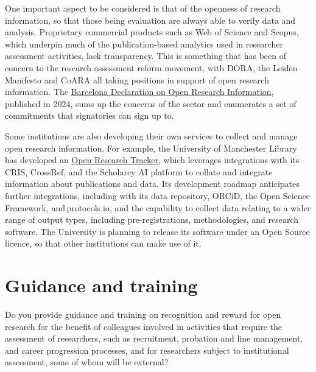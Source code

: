 \documentclass[
  letterpaper,
  DIV=11,
  numbers=noendperiod,
  oneside]{scrreprt}
\begin{document}
One important aspect to be considered is that of the openness of
research information, so that those being evaluation are always able to
verify data and analysis. Proprietary commercial products such as Web of
Science and Scopus, which underpin much of the publication-based
analytics used in researcher assessment activities, lack transparency.
This is something that has been of concern to the research assessment
reform movement, with DORA, the Leiden Manifesto and CoARA all taking
positions in support of open research information. The
\href{https://barcelona-declaration.org/}{Barcelona Declaration on Open
Research Information}, published in 2024, sums up the concerns of the
sector and enumerates a set of commitments that signatories can sign up
to.

Some institutions are also developing their own services to collect and
manage open research information. For example, the University of
Manchester Library has developed an
\href{https://www.openresearch.manchester.ac.uk/support/tracker/}{Open
Research Tracker}, which leverages integrations with its CRIS, CrossRef,
and the Scholarcy AI platform to collate and integrate information about
publications and data. Its development roadmap anticipates further
integrations, including with its data repository, ORCiD, the Open
Science Framework, and\,protocols.io, and the capability to collect data
relating to a wider range of output types, including pre-registrations,
methodologies, and research software. The University is planning to
release its software under an Open Source licence, so that other
institutions can make use of it.


\chapter{Guidance and training}\label{guidance-and-training}

\begin{tcolorbox}[enhanced jigsaw, colback=white, toprule=.15mm, colframe=quarto-callout-color-frame, arc=.35mm, opacityback=0, bottomrule=.15mm, breakable, left=2mm, leftrule=.75mm, rightrule=.15mm]

Do you provide guidance and training on recognition and reward for open
research for the benefit of colleagues involved in activities that
require the assessment of researchers, such as recruitment, probation
and line management, and career progression processes, and for
researchers subject to institutional assessment, some of whom will be
external?

\end{tcolorbox}
\end{document}

